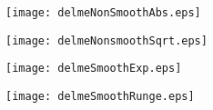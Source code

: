 \documentclass{article}
\begin{document}
	
	
	
	
	
	
	
	
	
	
	



	\begin{figure}  \texttt{[image: delmeNonSmoothAbs.eps]}
		\caption{}	\end{figure}

 \begin{figure}   	
\texttt{[image: delmeNonsmoothSqrt.eps]}
		\caption{}	\end{figure}

\begin{figure}  
\texttt{[image: delmeSmoothExp.eps]}
		\caption{}	\end{figure}

\begin{figure}  
\texttt{[image: delmeSmoothRunge.eps]}
		\caption{}	\end{figure}
	
	
	
	

\end{document}
